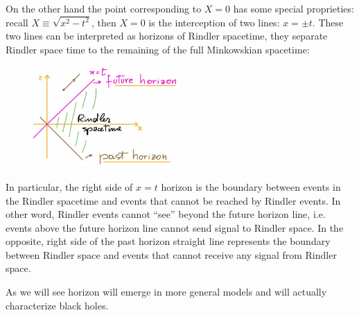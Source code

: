 \documentclass[../main/main.tex]{subfiles}
\begin{document}
On the other hand the point corresponding to $X=0$ has some special proprieties: recall $X\equiv\sqrt{x^2-t^2}$, then $X=0$ is the interception of two lines: $x=\pm t$. These two lines can be interpreted as horizons of Rindler spacetime, they separate Rindler space time to the remaining of the full Minkowskian spacetime:
\begin{figure}[H]
\centering
\includegraphics[width=5.5cm]{../img/rindler-horizons.jpg}
\end{figure}
\noindent In particular, the right side of $x=t$ horizon is the boundary between events in the Rindler spacetime and events that cannot be reached by Rindler events. In other word, Rindler events cannot ``see'' beyond the future horizon line, i.e. events above the future horizon line cannot send signal to Rindler space. In the opposite, right side of the past horizon straight line represents the boundary between Rindler space and events that cannot receive any signal from Rindler space. 

As we will see horizon will emerge in more general models and will actually characterize black holes.
\end{document}
